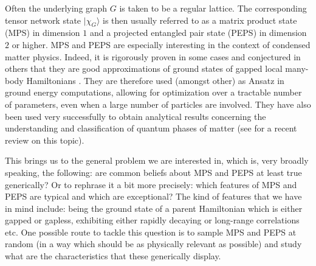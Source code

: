 \documentclass{amsart}
\newcommand{\C}{\mathbf{C}}
\newcommand{\ket}[1]{| #1 \rangle}
\begin{document}
\begin{figure}[h]
\begin{center}
    \end{center}
\end{figure}

Often the underlying graph $G$ is taken to be a regular lattice. The corresponding tensor network state $\ket{\chi_G}$ is then usually referred to as a matrix product state (MPS) in dimension $1$ and a projected entangled pair state (PEPS) in dimension $2$ or higher. MPS and PEPS are especially interesting in the context of condensed matter physics. Indeed, it is rigorously proven in some cases and conjectured in others that they are good approximations of ground states of gapped local many-body Hamiltonians \cite{HasA,HasB,AKLV,LVV}. They are therefore used (amongst other) as Ansatz in ground energy computations, allowing for optimization over a tractable number of parameters, even when a large number of particles are involved. They have also been used very successfully to obtain analytical results concerning the understanding and classification of quantum phases of matter (see \cite{Cirac20} for a recent review on this topic).

This brings us to the general problem we are interested in, which is, very broadly speaking, the following: are common beliefs about MPS and PEPS at least true generically? Or to rephrase it a bit more precisely: which features of MPS and PEPS are typical and which are exceptional? The kind of features that we have in mind include: being the ground state of a parent Hamiltonian which is either gapped or gapless, exhibiting either rapidly decaying or long-range correlations etc. One possible route to tackle this question is to sample MPS and PEPS at random (in a way which should be as physically relevant as possible) and study what are the characteristics that these generically display.
\end{document}
